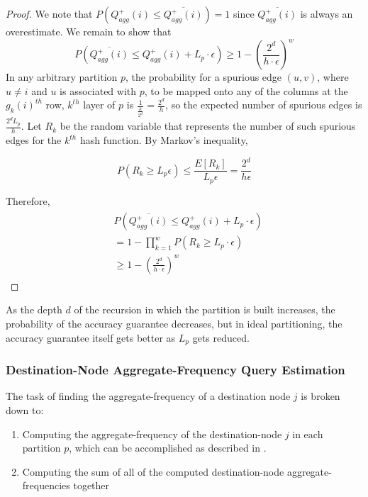 \begin{proof}
We note that $P(Q_{agg}^{+}(i) \leq \overline{Q_{agg}^{+}(i)}) = 1$ since $\overline{Q_{agg}^{+}(i)}$ is always an overestimate. We remain to show that
\[
P(\overline{Q_{agg}^{+}(i)} \leq Q_{agg}^{+}(i) + L_p \cdot \epsilon) \geq 1-(\frac{2^d}{h\cdot\epsilon})^w
\]
In any arbitrary partition $p$, the probability for a spurious edge $(u,v)$, where $u \neq i$ and $u$ is associated with $p$, to be mapped onto any of the columns at the $g_k(i)^{th}$ row, $k^{th}$ layer of $p$ is $\frac{1}{\frac{h}{2^d}} = \frac{2^d}{h}$, so the expected number of spurious edges is $\frac{2^dL_p}{h}$. Let $R_k$ be the random variable that represents the number of such spurious edges for the $k^{th}$ hash function. By Markov's inequality,

\begin{equation} \label{agg21}
  P(R_k \geq L_p \epsilon) \leq \frac{E[R_k]}{L_p \epsilon} = \frac{2^d}{h\epsilon}
\end{equation}

Therefore,
\begin{align}
\begin{split}
&  P(\overline{Q_{agg}^{+}(i)} \leq Q_{agg}^{+}(i) + L_p \cdot \epsilon)
\\  &= 1 - \prod _{k=1}^{w}P(R_k \geq L_p \cdot \epsilon)
\\  &\geq 1-(\frac{2^d}{h\cdot\epsilon})^w
\end{split}
\end{align}

\end{proof}

\begin{remarks}
As the depth $d$ of the recursion in which the partition is built increases, the probability of the accuracy guarantee decreases, but in ideal partitioning, the accuracy guarantee itself gets better as $L_p$ gets reduced.
\end{remarks}

\subsubsection{Destination-Node Aggregate-Frequency Query Estimation}

The task of finding the aggregate-frequency of a destination node $j$ is broken down to:

\begin{enumerate}
\item Computing the aggregate-frequency of the destination-node $j$ in each partition $p$, which can be accomplished as described in \cite{khan}.
\item Computing the sum of all of the computed destination-node aggregate-frequencies together
\end{enumerate}

